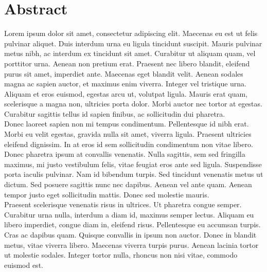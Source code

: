 %
%
%

\newpage
\chapter*{Abstract}

Lorem ipsum dolor sit amet, consectetur adipiscing elit. Maecenas eu est ut felis pulvinar aliquet. Duis interdum urna eu ligula tincidunt suscipit. Mauris pulvinar metus nibh, ac interdum ex tincidunt sit amet. Curabitur ut aliquam quam, vel porttitor urna. Aenean non pretium erat. Praesent nec libero blandit, eleifend purus sit amet, imperdiet ante. Maecenas eget blandit velit. Aenean sodales magna ac sapien auctor, et maximus enim viverra. Integer vel tristique urna. Aliquam et eros euismod, egestas arcu ut, volutpat ligula. Mauris erat quam, scelerisque a magna non, ultricies porta dolor. Morbi auctor nec tortor at egestas. Curabitur sagittis tellus id sapien finibus, ac sollicitudin dui pharetra.\\

Donec laoreet sapien non mi tempus condimentum. Pellentesque id nibh erat. Morbi eu velit egestas, gravida nulla sit amet, viverra ligula. Praesent ultricies eleifend dignissim. In at eros id sem sollicitudin condimentum non vitae libero. Donec pharetra ipsum at convallis venenatis. Nulla sagittis, sem sed fringilla maximus, mi justo vestibulum felis, vitae feugiat eros ante sed ligula. Suspendisse porta iaculis pulvinar. Nam id bibendum turpis. Sed tincidunt venenatis metus ut dictum. Sed posuere sagittis nunc nec dapibus. Aenean vel ante quam. Aenean tempor justo eget sollicitudin mattis. Donec sed molestie mauris.\\

Praesent scelerisque venenatis risus in ultrices. Ut pharetra congue semper. Curabitur urna nulla, interdum a diam id, maximus semper lectus. Aliquam eu libero imperdiet, congue diam in, eleifend risus. Pellentesque eu accumsan turpis. Cras ac dapibus quam. Quisque convallis in ipsum non auctor. Donec in blandit metus, vitae viverra libero. Maecenas viverra turpis purus. Aenean lacinia tortor ut molestie sodales. Integer tortor nulla, rhoncus non nisi vitae, commodo euismod est.

